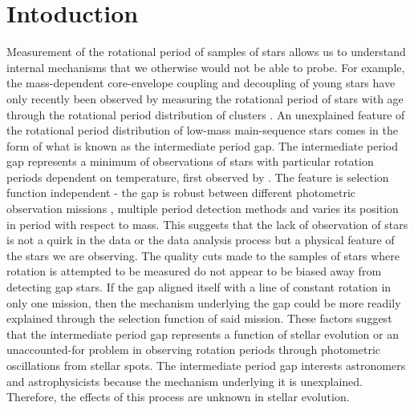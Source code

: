 \section{Intoduction}
\label{sec:intro}
Measurement of the rotational period of samples of stars allows us to understand internal mechanisms that we otherwise would not be able to probe.
For example, the mass-dependent core-envelope coupling and decoupling of young stars have only recently been observed by measuring the rotational period of stars with age through the rotational period distribution of clusters \citep{reinhold_rotation_2015-1}.
An unexplained feature of the rotational period distribution of low-mass main-sequence stars comes in the form of what is known as the intermediate period gap.
The intermediate period gap represents a minimum of observations of stars with particular rotation periods dependent on temperature, first observed by \citet{mcquillan_rotation_2014}.
The feature is selection function independent - the gap is robust between different photometric observation missions \citep{mcquillan_rotation_2014,davenport_rotating_2017,davenport_rotating_2018,lu_bridging_2022}, multiple period detection methods and varies its position in period with respect to mass. 
This suggests that the lack of observation of stars is not a quirk in the data or the data analysis process but a physical feature of the stars we are observing.
The quality cuts made to the samples of stars where rotation is attempted to be measured do not appear to be biased away from detecting gap stars.
If the gap aligned itself with a line of constant rotation in only one mission, then the mechanism underlying the gap could be more readily explained through the selection function of said mission.
These factors suggest that the intermediate period gap represents a function of stellar evolution or an unaccounted-for problem in observing rotation periods through photometric oscillations from stellar spots.
The intermediate period gap interests astronomers and astrophysicists because the mechanism underlying it is unexplained.
Therefore, the effects of this process are unknown in stellar evolution.


